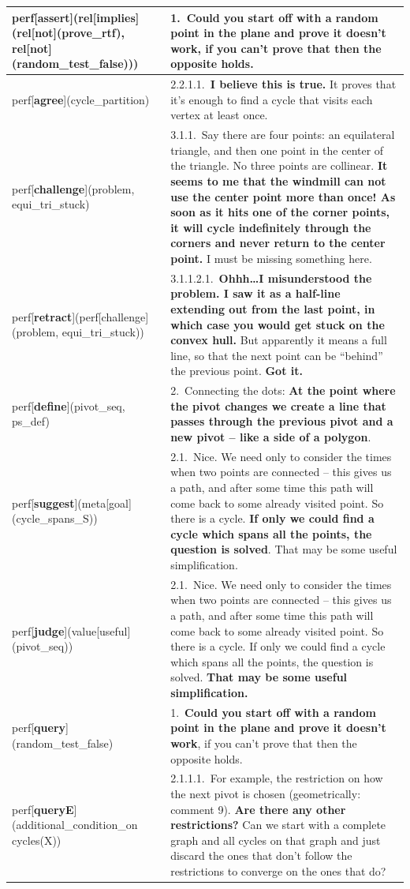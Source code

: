 \documentclass[smallextended,oneside]{svjour3}       %
\newcounter{turn}
\begin{document}
{\noindent\begin{tabular}{|p{}|p{}|}
\hline
perf[\textbf{assert}](rel[implies](rel[not](prove_rtf), rel[not](random_test_false))) & 1.~Could you start off with a random point in the plane and prove it doesn't work, \textbf{if you can't prove that then the opposite holds.}\\ \hline
perf[\textbf{agree}](cycle_partition) & 2.2.1.1.~\textbf{I believe this is true.} It proves that it's enough to find a cycle that visits each vertex at least once.\\ \hline
perf[\textbf{challenge}](problem, equi_tri_stuck) & 3.1.1.~Say there are four points: an equilateral triangle, and then one point in the center of the triangle. No three points are collinear. \textbf{It seems to me that the windmill can not use the center point more than once! As soon as it hits one of the corner points, it will cycle indefinitely through the corners and never return to the center point.} I must be missing something here.\\ \hline
perf[\textbf{retract}](perf[challenge](problem, equi_tri_stuck)) & 3.1.1.2.1.~\textbf{Ohhh\ldots I misunderstood the problem. I saw it as a half-line extending out from the last point, in which case you would get stuck on the convex hull.} But apparently it means a full line, so that the next point can be ``behind'' the previous point. \textbf{Got it.} \\ \hline
perf[\textbf{define}](pivot_seq, ps_def) & 2.~Connecting the dots: \textbf{At the point where the pivot changes we create a line that passes through the previous pivot and a new pivot -- like a side of a polygon}.\\ \hline
perf[\textbf{suggest}](meta[goal](cycle_spans_S)) & 2.1.~Nice. We need only to consider the times when two points are connected -- this gives us a path, and after some time this path will come back to some already visited point. So there is a cycle. \textbf{If only we could find a cycle which spans all the points, the question is solved}. That may be some useful simplification.\\ \hline
perf[\textbf{judge}](value[useful](pivot_seq)) & 2.1.~Nice. We need only to consider the times when two points are connected -- this gives us a path, and after some time this path will come back to some already visited point. So there is a cycle. If only we could find a cycle which spans all the points, the question is solved. \textbf{That may be some useful simplification.} \\ \hline
perf[\textbf{query}](random_test_false) & 1.~\textbf{Could you start off with a random point in the plane and prove it doesn't work}, if you can't prove that then the opposite holds. \\ \hline
perf[\textbf{queryE}](additional_condition_on cycles(X)) & 2.1.1.1.~For example, the restriction on how the next pivot is chosen (geometrically: comment 9). \textbf{Are there any other restrictions?} Can we start with a complete graph and all cycles on that graph and just discard the ones that don't follow the restrictions to converge on the ones that do?\\ \hline
\end{tabular}

}
\end{document}
